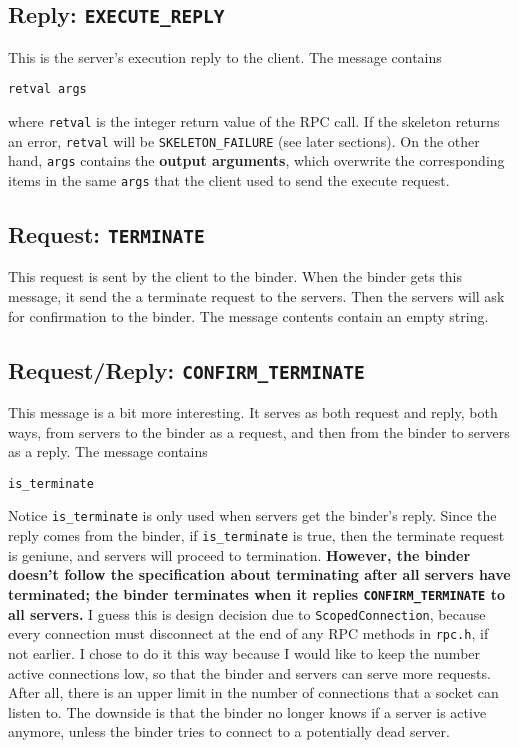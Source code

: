 \subsection{Reply: \tt EXECUTE\_REPLY}
This is the server's execution reply to the client.
The message contains
\begin{verbatim}
retval args
\end{verbatim}
where {\tt retval} is the integer return value of the RPC call.
If the skeleton returns an error, {\tt retval} will be {\tt SKELETON\_FAILURE} (see later sections).
On the other hand, {\tt args} contains the {\bf output arguments}, which overwrite the corresponding items in the same {\tt args} that the client used to send the execute request.

\subsection{Request: \tt TERMINATE}
This request is sent by the client to the binder.
When the binder gets this message, it send the a terminate request to the servers.
Then the servers will ask for confirmation to the binder.
The message contents contain an empty string.

\subsection{Request/Reply: \tt CONFIRM\_TERMINATE}
This message is a bit more interesting.
It serves as both request and reply, both ways, from servers to the binder as a request, and then from the binder to servers as a reply.
The message contains
\begin{verbatim}
is_terminate
\end{verbatim}
Notice {\tt is\_terminate} is only used when servers get the binder's reply.
Since the reply comes from the binder, if {\tt is\_terminate} is true, then the terminate request is geniune, and servers will proceed to termination.
{\bf However, the binder doesn't follow the specification about terminating after all servers have terminated; the binder terminates when it replies {\tt CONFIRM\_TERMINATE} to all servers.}
I guess this is design decision due to {\tt ScopedConnection}, because every connection must disconnect at the end of any RPC methods in {\tt rpc.h}, if not earlier.
I chose to do it this way because I would like to keep the number active connections low, so that the binder and servers can serve more requests.
After all, there is an upper limit in the number of connections that a socket can listen to.
The downside is that the binder no longer knows if a server is active anymore, unless the binder tries to connect to a potentially dead server.

